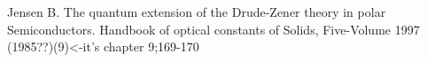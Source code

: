 \begin{thebibliography}{9}

       Jensen B.
       The quantum extension of the Drude-Zener theory in polar Semiconductors.
       Handbook of optical constants of Solids, Five-Volume 1997 (1985??)(9)<-it's chapter 9;169-170




\end{thebibliography}

